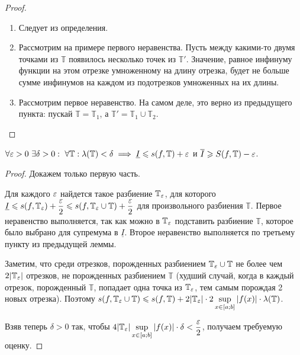 \documentclass[a4paper]{article}
\theoremstyle{named}
\newcommand{\T}{\mathbb{T}}
\begin{document}
        \begin{proof}~

            \begin{enumerate}
            \item
                Следует из определения.

            \item
                Рассмотрим на примере первого неравенства. Пусть между какими-то двумя точками из $\T$ появилось несколько точек из $\T'$. Значение, равное инфинуму функции на этом отрезке умноженному на длину отрезка, будет не больше сумме инфинумов на каждом из подотрезков умноженных на их длины.

            \item
                Рассмотрим первое неравенство. На самом деле, это верно из предыдущего пункта: пускай $\T = \T_1$, а $\T' = \T_1 \cup \T_2$.
            \end{enumerate}
        \end{proof}

        \begin{lemma*}
            $\forall \eps > 0 \ \exists \delta > 0: \ \forall \T: \lambda(\T) < \delta \implies \underline{I} \leq s(f, \T) + \eps$ и $\overline{I} \geq S(f, \T) - \eps$.
        \end{lemma*}

        \begin{proof}
            Докажем только первую часть. 

            Для каждого $\varepsilon$ найдется такое разбиение $\T_{\eps}$, для которого $\underline{I} \leq s(f, \T_{\eps}) + \dfrac{\eps}{2} \leq s(f, \T_{\eps} \cup \T) + \dfrac{\eps}{2}$ для произвольного разбиения $\T$. Первое неравенство выполняется, так как можно в $\T_{\eps}$ подставить разбиение $\T$, которое было выбрано для супремума в $\underline{I}$. Второе неравенство выполняется по третьему пункту из предыдущей леммы.

            Заметим, что среди отрезков, порожденных разбиением $\T_{\eps} \cup \T$ не более чем $2|\T_{\eps}|$ отрезков, не порожденных разбиением $\T$ (худший случай, когда в каждый отрезок, порожденный $\T$, попадает одна точка из $\T_{\eps}$, тем самым порождая 2 новых отрезка). Поэтому $s(f, \T_{\eps} \cup \T) \leq s(f, \T) + 2|\T_{\eps}| \cdot 2 \sup\limits_{x \in [a; b]} |f(x)| \cdot \lambda(\T)$.

            Взяв теперь $\delta > 0$ так, чтобы $4|\T_{\eps}| \sup\limits_{x \in [a; b]} |f(x)| \cdot \delta < \dfrac{\eps}{2}$, получаем требуемую оценку.
        \end{proof}
\end{document}
